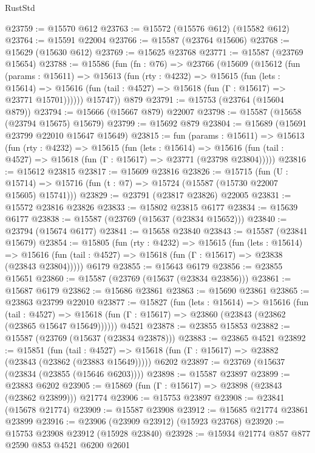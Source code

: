 \begin{lexlean}{RustStd}
\begin{coremodule}
@23759 := @15570 @612
@23763 := @15572 (@15576 @612) (@15582 @612)
@23764 := @15591 @22004
@23766 := @15587 (@23764 @15606)
@23768 := @15629 (@15630 @612)
@23769 := @15625 @23768
@23771 := @15587 (@23769 @15654)
@23788 := @15586
    (fun (fn : @76) =>
    @23766
      (@15609
        (@15612
          (fun (params : @15611) =>
          @15613
            (fun (rty : @4232) =>
            @15615
              (fun (lets : @15614) =>
              @15616 (fun (tail : @4527) => @15618 (fun (Γ : @15617) => @23771 @15701))))))
        @15747))
    @879
@23791 := @15753 (@23764 (@15604 @879))
@23794 := @15666 (@15667 @879) @22007
@23798 := @15587 (@15658 (@23794 @15675) @15679)
@23799 := @15692 @879
@23804 := @15689 (@15691 @23799 @22010 @15647 @15649)
@23815 := fun (params : @15611) =>
  @15613
    (fun (rty : @4232) =>
    @15615
      (fun (lets : @15614) =>
      @15616 (fun (tail : @4527) => @15618 (fun (Γ : @15617) => @23771 (@23798 @23804)))))
@23816 := @15612 @23815
@23817 := @15609 @23816
@23826 := @15715
    (fun (U : @15714) => @15716 (fun (t : @7) => @15724 (@15587 (@15730 @22007 @15605) @15741)))
@23829 := @23791 (@23817 @23826) @22005
@23831 := @15572 @23816 @23826
@23833 := @15802 @23815 @6177
@23834 := @15639 @6177
@23838 := @15587 (@23769 (@15637 (@23834 @15652)))
@23840 := @23794 (@15674 @6177)
@23841 := @15658 @23840
@23843 := @15587 (@23841 @15679)
@23854 := @15805
    (fun (rty : @4232) =>
    @15615
      (fun (lets : @15614) =>
      @15616 (fun (tail : @4527) => @15618 (fun (Γ : @15617) => @23838 (@23843 @23804)))))
    @6179
@23855 := @15643 @6179
@23856 := @23855 @15651
@23860 := @15587 (@23769 (@15637 (@23834 @23856)))
@23861 := @15687 @6179
@23862 := @15686 @23861
@23863 := @15690 @23861
@23865 := @23863 @23799 @22010
@23877 := @15827
    (fun (lets : @15614) =>
    @15616
      (fun (tail : @4527) =>
      @15618 (fun (Γ : @15617) => @23860 (@23843 (@23862 (@23865 @15647 @15649))))))
    @4521
@23878 := @23855 @15853
@23882 := @15587 (@23769 (@15637 (@23834 @23878)))
@23883 := @23865 @4521
@23892 := @15851
    (fun (tail : @4527) => @15618 (fun (Γ : @15617) => @23882 (@23843 (@23862 (@23883 @15649)))))
    @6202
@23897 := @23769 (@15637 (@23834 (@23855 (@15646 @6203))))
@23898 := @15587 @23897
@23899 := @23883 @6202
@23905 := @15869 (fun (Γ : @15617) => @23898 (@23843 (@23862 @23899))) @21774
@23906 := @15753 @23897
@23908 := @23841 (@15678 @21774)
@23909 := @15587 @23908
@23912 := @15685 @21774 @23861 @23899
@23916 := @23906 (@23909 @23912) (@15923 @23768)
@23920 := @15753 @23908 @23912 (@15928 @23840)
@23928 := @15934 @21774 @857 @877 @2590 @853 @4521 @6200 @2601

\end{coremodule}
\end{lexlean}

